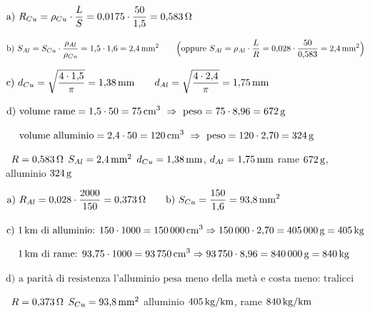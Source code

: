 

\newcommand{\pas}[1]{\par\hspace*{4mm}$\displaystyle #1$\par}
\newcommand{\ris}[1]{\par\vspace{1mm}\hspace*{4mm}\colorbox{grigio}{\strut\ #1\ }\par}






\pas{\text{a) } R_{Cu} = \rho_{Cu} \cdot \frac{L}{S} = 0{,}0175 \cdot \frac{50}{1{,}5} = 0{,}583\U{\Omega}}
\pas{\text{b) } S_{Al} = S_{Cu} \cdot \frac{\rho_{Al}}{\rho_{Cu}} = 1{,}5 \cdot 1{,}6 = 2{,}4\U{mm^2} \qquad \Big(\text{oppure } S_{Al} = \rho_{Al} \cdot \frac{L}{R} = 0{,}028 \cdot \frac{50}{0{,}583} = 2{,}4\U{mm^2}\Big)}
\pas{\text{c) } d_{Cu} = \sqrt{\frac{4 \cdot 1{,}5}{\pi}} = 1{,}38\U{mm} \qquad d_{Al} = \sqrt{\frac{4 \cdot 2{,}4}{\pi}} = 1{,}75\U{mm}}
\pas{\text{d) volume rame} = 1{,}5 \cdot 50 = 75\U{cm^3} \ \Rightarrow\ \text{peso} = 75 \cdot 8{,}96 = 672\U{g}}
\pas{\phantom{\text{d) }}\text{volume alluminio} = 2{,}4 \cdot 50 = 120\U{cm^3} \ \Rightarrow\ \text{peso} = 120 \cdot 2{,}70 = 324\U{g}}
\ris{$R = 0{,}583\,\mathrm{\Omega}$ \quad $S_{Al} = 2{,}4\,\mathrm{mm^2}$ \quad $d_{Cu} = 1{,}38\,\mathrm{mm}$, $d_{Al} = 1{,}75\,\mathrm{mm}$ \quad rame $672\,\mathrm{g}$, alluminio $324\,\mathrm{g}$}

\pas{\text{a) } R_{Al} = 0{,}028 \cdot \frac{2000}{150} = 0{,}373\U{\Omega} \qquad \text{b) } S_{Cu} = \frac{150}{1{,}6} = 93{,}8\U{mm^2}}
\pas{\text{c) } 1\U{km} \text{ di alluminio: } 150 \cdot 1000 = 150\,000\U{cm^3} \Rightarrow 150\,000 \cdot 2{,}70 = 405\,000\U{g} = 405\U{kg}}
\pas{\phantom{\text{c) }} 1\U{km} \text{ di rame: } 93{,}75 \cdot 1000 = 93\,750\U{cm^3} \Rightarrow 93\,750 \cdot 8{,}96 = 840\,000\U{g} = 840\U{kg}}
\pas{\text{d) a parità di resistenza l'alluminio pesa meno della metà e costa meno: tralicci più leggeri e distanti}}
\ris{$R = 0{,}373\,\mathrm{\Omega}$ \quad $S_{Cu} = 93{,}8\,\mathrm{mm^2}$ \quad alluminio $405\,\mathrm{kg/km}$, rame $840\,\mathrm{kg/km}$}

